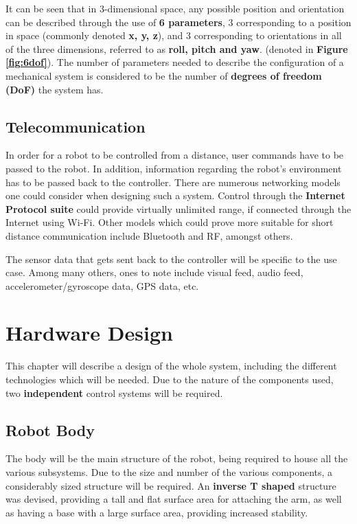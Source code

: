 \documentclass[12p,a4paper]{report}
\begin{document}
It can be seen that in 3-dimensional space, any possible position and orientation can be described through the use of  \textbf{6 parameters}, 3 corresponding to a position in space (commonly denoted \textbf{x, y, z}), and 3 corresponding to orientations in all of the three dimensions, referred to as \textbf{roll, pitch and yaw}. (denoted in \textbf{Figure \ref{fig:6dof}}). The number of parameters needed to describe the configuration of a mechanical system is considered to be the number of \textbf{degrees of freedom (DoF)} the system has.\\

\section{Telecommunication}
In order for a robot to be controlled from a distance, user commands have to be passed to the robot. In addition, information regarding the robot's environment has to be passed back to the controller. There are numerous networking models one could consider when designing such a system. Control through the \textbf{Internet Protocol suite} could provide virtually unlimited range, if connected through the Internet using Wi-Fi. Other models which could prove more suitable for short distance communication include Bluetooth and RF, amongst others.

The sensor data that gets sent back to the controller will be specific to the use case. Among many others, ones to note include visual feed, audio feed, accelerometer/gyroscope data, GPS data, etc.


\chapter{Hardware Design}

This chapter will describe a design of the whole system, including the different technologies which will be needed.
Due to the nature of the components used, two \textbf{independent} control systems will be required.
 
\section{Robot Body}
The body will be the main structure of the robot, being required to house all the various subsystems. Due to the size and number of the various components, a considerably sized structure will be required. An \textbf{inverse T shaped} structure was devised, providing a tall and flat surface area for attaching the arm, as well as having a base with a large surface area, providing increased stability. 
\end{document}
